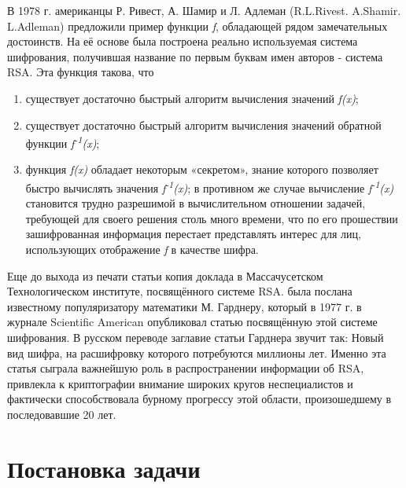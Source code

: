 В 1978 г. американцы Р. Ривест, А. Шамир и Л. Адлеман (R.L.Rivest. A.Shamir. L.Adleman) предложили пример функции \textit{f}, обладающей рядом 
замечательных достоинств. На её основе была построена реально используемая система шифрования, получившая название по первым буквам имен авторов - 
система RSA. Эта функция такова, что
\begin{enumerate}
    \item существует достаточно быстрый алгоритм вычисления значений \textit{f(x)};
    \item существует достаточно быстрый алгоритм вычисления значений обратной функции \textit{f\textsuperscript{-1}(x)};
    \item функция \textit{f(x)} обладает некоторым «секретом», знание которого позволяет быстро вычислять значения \textit{f\textsuperscript{-1}(x)}; в противном же случае вычисление \textit{f\textsuperscript{-1}(x)} становится трудно разрешимой в вычислительном отношении задачей, требующей для своего решения столь много времени, что по его прошествии зашифрованная информация перестает представлять интерес для лиц, использующих отображение \textit{f} в качестве шифра.
\end{enumerate}	

Еще до выхода из печати статьи копия доклада в Массачусетском Технологическом институте, посвящённого системе RSA. была послана известному 
популяризатору математики М. Гарднеру, который в 1977 г. в журнале Scientific American опубликовал статью посвящённую этой системе шифрования. 
В русском переводе заглавие статьи Гарднера звучит так: Новый вид шифра, на расшифровку которого потребуются миллионы лет. Именно эта статья сыграла 
важнейшую роль в распространении информации об RSA, привлекла к криптографии внимание широких кругов неспециалистов и фактически способствовала 
бурному прогрессу этой области, произошедшему в последовавшие 20 лет.

\section{Постановка задачи}
